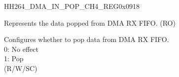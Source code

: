 \begin{register}{H}{H264\_DMA\_IN\_POP\_CH4\_REG}{0x0918}\label{regdesc:H264DMAINPOPCH4REG}
%
%
%
\regnewline%
\begin{regdesc}\begin{reglist}
\label{fielddesc:H264DMAINFIFORDATACH4}\item [H264\_DMA\_INFIFO\_RDATA\_CH4] Represents the data popped from DMA RX FIFO. (RO)
\label{fielddesc:H264DMAINFIFOPOPCH4}\item [H264\_DMA\_INFIFO\_POP\_CH4] Configures whether to pop data from DMA RX FIFO.\\
0: No effect\\
1: Pop\\ (R/W/SC)
\end{reglist}\end{regdesc}
\end{register}


